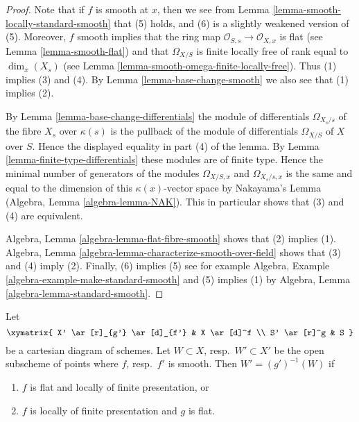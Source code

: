 \begin{proof}
Note that if $f$ is smooth at $x$, then we see from Lemma
\ref{lemma-smooth-locally-standard-smooth} that (5) holds, and (6) is a slightly
weakened version of (5). Moreover, $f$ smooth implies that the ring
map $\mathcal{O}_{S, s} \to \mathcal{O}_{X, x}$ is flat (see
Lemma \ref{lemma-smooth-flat}) and that $\Omega_{X/S}$ is
finite locally free of rank equal to
$\dim_x(X_s)$ (see Lemma \ref{lemma-smooth-omega-finite-locally-free}).
Thus (1) implies (3) and (4). By Lemma \ref{lemma-base-change-smooth}
we also see that (1) implies (2).

\medskip\noindent
By Lemma \ref{lemma-base-change-differentials}
the module of differentials $\Omega_{X_s/s}$ of the fibre $X_s$
over $\kappa(s)$ is the pullback of the module of differentials
$\Omega_{X/S}$ of $X$ over $S$. Hence the displayed equality in
part (4) of the lemma. By Lemma \ref{lemma-finite-type-differentials}
these modules are of finite type. Hence the minimal number of
generators of the modules
$\Omega_{X/S, x}$ and $\Omega_{X_s/s, x}$ is the same and equal to the
dimension of this $\kappa(x)$-vector space by Nakayama's Lemma
(Algebra, Lemma \ref{algebra-lemma-NAK}). This in particular shows that
(3) and (4) are equivalent.

\medskip\noindent
Algebra, Lemma \ref{algebra-lemma-flat-fibre-smooth} shows that
(2) implies (1).
Algebra, Lemma \ref{algebra-lemma-characterize-smooth-over-field}
shows that (3) and (4) imply (2). Finally, (6) implies (5)
see for example Algebra, Example \ref{algebra-example-make-standard-smooth}
and (5) implies (1) by Algebra, Lemma \ref{algebra-lemma-standard-smooth}.
\end{proof}

\begin{lemma}
\label{lemma-set-points-where-fibres-smooth}
Let
$$
\xymatrix{
X' \ar[r]_{g'} \ar[d]_{f'} & X \ar[d]^f \\
S' \ar[r]^g & S
}
$$
be a cartesian diagram of schemes. Let $W \subset X$, resp.\ $W' \subset X'$
be the open subscheme of points where $f$, resp.\ $f'$ is smooth.
Then $W' = (g')^{-1}(W)$ if
\begin{enumerate}
\item $f$ is flat and locally of finite presentation, or
\item $f$ is locally of finite presentation and $g$ is flat.
\end{enumerate}
\end{lemma}

